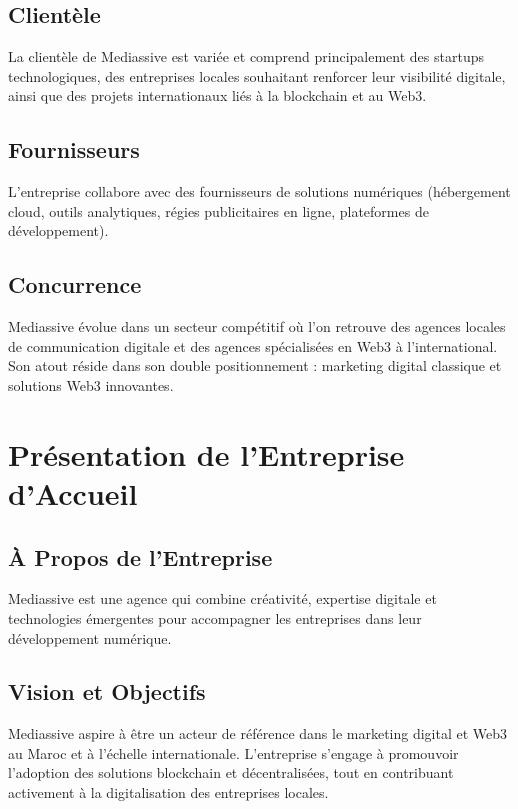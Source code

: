 \subsection{Clientèle}

La clientèle de Mediassive est variée et comprend principalement des startups technologiques, des entreprises locales souhaitant renforcer leur visibilité digitale, ainsi que des projets internationaux liés à la blockchain et au Web3.

\subsection{Fournisseurs}

L'entreprise collabore avec des fournisseurs de solutions numériques (hébergement cloud, outils analytiques, régies publicitaires en ligne, plateformes de développement).

\subsection{Concurrence}

Mediassive évolue dans un secteur compétitif où l'on retrouve des agences locales de communication digitale et des agences spécialisées en Web3 à l'international. Son atout réside dans son double positionnement : marketing digital classique et solutions Web3 innovantes.

\section{Présentation de l'Entreprise d'Accueil}

\subsection{À Propos de l'Entreprise}

Mediassive est une agence qui combine créativité, expertise digitale et technologies émergentes pour accompagner les entreprises dans leur développement numérique.

\subsection{Vision et Objectifs}

Mediassive aspire à être un acteur de référence dans le marketing digital et Web3 au Maroc et à l'échelle internationale. L'entreprise s'engage à promouvoir l'adoption des solutions blockchain et décentralisées, tout en contribuant activement à la digitalisation des entreprises locales.

